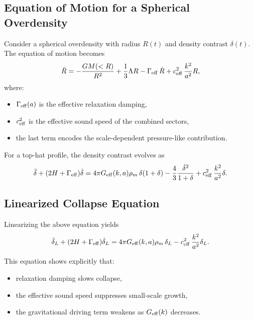 \documentclass[11pt,a4paper]{article}
\begin{document}
\subsection{Equation of Motion for a Spherical Overdensity}

Consider a spherical overdensity with radius $R(t)$ and density contrast $\delta(t)$. The
equation of motion becomes
\begin{equation}
\ddot{R}
= -\frac{GM(<R)}{R^2}
+ \frac{1}{3}\Lambda R
- \Gamma_{\rm eff}\,\dot{R}
+ c_{\rm eff}^2\,\frac{k^2}{a^2} R,
\end{equation}
where:
\begin{itemize}
\item $\Gamma_{\rm eff}(a)$ is the effective relaxation damping,
\item $c_{\rm eff}^2$ is the effective sound speed of the combined sectors,
\item the last term encodes the scale-dependent pressure-like contribution.
\end{itemize}

For a top-hat profile, the density contrast evolves as
\begin{equation}
\ddot{\delta}
+ (2H + \Gamma_{\rm eff})\dot{\delta}
= 4\pi G_{\rm eff}(k,a)\rho_m\,\delta(1+\delta)
- \frac{4}{3}\frac{\dot{\delta}^2}{1+\delta}
+ c_{\rm eff}^2\,\frac{k^2}{a^2}\delta.
\end{equation}

\subsection{Linearized Collapse Equation}

Linearizing the above equation yields
\begin{equation}
\ddot{\delta}_L
+ (2H + \Gamma_{\rm eff})\dot{\delta}_L
= 4\pi G_{\rm eff}(k,a)\rho_m\,\delta_L
- c_{\rm eff}^2\,\frac{k^2}{a^2}\delta_L.
\end{equation}

This equation shows explicitly that:
\begin{itemize}
\item relaxation damping slows collapse,
\item the effective sound speed suppresses small-scale growth,
\item the gravitational driving term weakens as $G_{\rm eff}(k)$ decreases.
\end{itemize}
\end{document}

